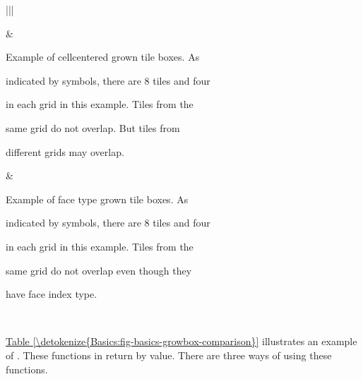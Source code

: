 \documentclass[letterpaper,10pt,english]{sphinxmanual}
\begin{document}
\begin{savenotes}\sphinxattablestart
\centering
{}
\sphinxthecaptionisattop
{}\label{\detokenize{Basics:id5}}\label{\detokenize{Basics:fig-basics-growbox-comparison}}
\sphinxaftertopcaption
\begin{tabular}[t]{|*{2}{|}}
\hline

\sphinxAtStartPar
{}
&
\sphinxAtStartPar
{}
\\
\hline
\begin{DUlineblock}{0em}
\item[] Example of cell\sphinxhyphen{}centered grown tile boxes. As
\item[] indicated by symbols, there are 8 tiles and four
\item[] in each grid in this example. Tiles from the
\item[] same grid do not overlap. But tiles from
\item[] different grids may overlap.
\end{DUlineblock}
&
\begin{DUlineblock}{0em}
\item[] Example of face type grown tile boxes. As
\item[] indicated by symbols, there are 8 tiles and four
\item[] in each grid in this example. Tiles from the
\item[] same grid do not overlap even though they
\item[] have face index type.
\end{DUlineblock}
\\
\hline
\end{tabular}
\par
\sphinxattableend\end{savenotes}

\sphinxAtStartPar
\hyperref[\detokenize{Basics:fig-basics-growbox-comparison}]{Table \ref{\detokenize{Basics:fig-basics-growbox-comparison}}} illustrates an example of
. These functions in  return  by
value. There are three ways of using these functions.
\end{document}
